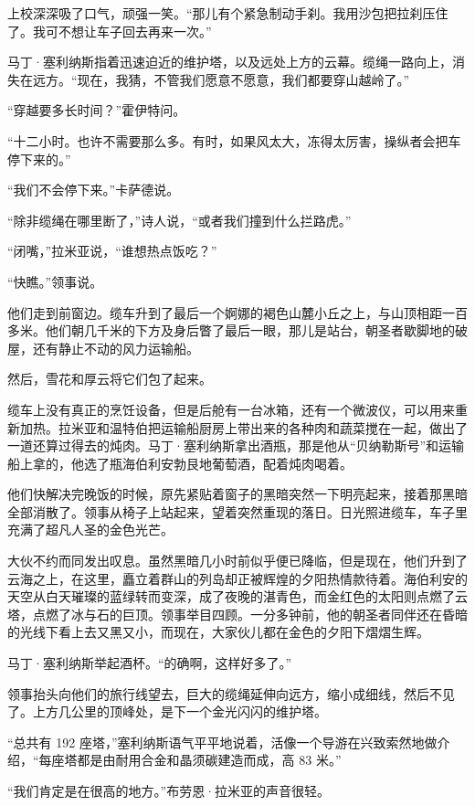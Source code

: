 \documentclass[AutoFakeBold=true]{book}
\begin{document}
上校深深吸了口气，顽强一笑。``那儿有个紧急制动手刹。我用沙包把拉刹压住了。我可不想让车子回去再来一次。''

马丁·塞利纳斯指着迅速迫近的维护塔，以及远处上方的云幕。缆绳一路向上，消失在远方。``现在，我猜，不管我们愿意不愿意，我们都要穿山越岭了。''

``穿越要多长时间？''霍伊特问。

``十二小时。也许不需要那么多。有时，如果风太大，冻得太厉害，操纵者会把车停下来的。''

``我们不会停下来。''卡萨德说。

``除非缆绳在哪里断了，''诗人说，``或者我们撞到什么拦路虎。''

``闭嘴，''拉米亚说，``谁想热点饭吃？''

``快瞧。''领事说。

他们走到前窗边。缆车升到了最后一个婀娜的褐色山麓小丘之上，与山顶相距一百多米。他们朝几千米的下方及身后瞥了最后一眼，那儿是站台，朝圣者歇脚地的破屋，还有静止不动的风力运输船。

然后，雪花和厚云将它们包了起来。

\vspace*{1em}

缆车上没有真正的烹饪设备，但是后舱有一台冰箱，还有一个微波仪，可以用来重新加热。拉米亚和温特伯把运输船厨房上带出来的各种肉和蔬菜搅在一起，做出了一道还算过得去的炖肉。马丁·塞利纳斯拿出酒瓶，那是他从``贝纳勒斯号''和运输船上拿的，他选了瓶海伯利安勃艮地葡萄酒，配着炖肉喝着。

他们快解决完晚饭的时候，原先紧贴着窗子的黑暗突然一下明亮起来，接着那黑暗全部消散了。领事从椅子上站起来，望着突然重现的落日。日光照进缆车，车子里充满了超凡人圣的金色光芒。

大伙不约而同发出叹息。虽然黑暗几小时前似乎便已降临，但是现在，他们升到了云海之上，在这里，矗立着群山的列岛却正被辉煌的夕阳热情款待着。海伯利安的天空从白天璀璨的蓝绿转而变深，成了夜晚的湛青色，而金红色的太阳则点燃了云塔，点燃了冰与石的巨顶。领事举目四顾。一分多钟前，他的朝圣者同伴还在昏暗的光线下看上去又黑又小，而现在，大家伙儿都在金色的夕阳下熠熠生辉。

马丁·塞利纳斯举起酒杯。``的确啊，这样好多了。''

领事抬头向他们的旅行线望去，巨大的缆绳延伸向远方，缩小成细线，然后不见了。上方几公里的顶峰处，是下一个金光闪闪的维护塔。

``总共有 192 座塔，''塞利纳斯语气平平地说着，活像一个导游在兴致索然地做介绍，``每座塔都是由耐用合金和晶须碳建造而成，高 83 米。''

``我们肯定是在很高的地方。''布劳恩·拉米亚的声音很轻。
\end{document}
